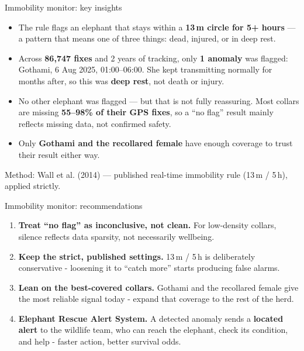\documentclass{beamer}
\newcommand{\hi}[1]{\textbf{\textcolor{hicolor}{#1}}}
\begin{document}
	\begin{frame}{Immobility monitor: key insights}
		\small
		\setlength{\itemsep}{6pt}
		\begin{itemize}
			\item The rule flags an elephant that stays within a \hi{13\,m circle for
				5+ hours} --- a pattern that means one of three things: dead, injured, or
			in deep rest.
			\item Across \hi{86,747 fixes} and 2 years of tracking, only \hi{1 anomaly}
			was flagged: Gothami, 6 Aug 2025, 01:00--06:00. She kept transmitting
			normally for months after, so this was \hi{deep rest}, not death or injury.
			\item No other elephant was flagged --- but that is not fully reassuring. Most
			collars are missing \hi{55--98\% of their GPS fixes}, so a ``no flag'' result
			mainly reflects missing data, not confirmed safety.
			\item Only \hi{Gothami and the recollared female} have enough coverage to
			trust their result either way.
		\end{itemize}
		\vfill
		{\footnotesize Method: Wall et al. (2014) --- published real-time immobility
			rule (13\,m / 5\,h), applied strictly.}
	\end{frame}
	
	
	
	\begin{frame}{Immobility monitor: recommendations}
		\small
		\setlength{\itemsep}{8pt}
		\begin{enumerate}
			\item \textbf{Treat ``no flag'' as inconclusive, not clean.} For low-density
			collars, silence reflects data sparsity, not necessarily wellbeing.
			\item \textbf{Keep the strict, published settings.} 13\,m / 5\,h is
			deliberately conservative - loosening it to ``catch more'' starts
			producing false alarms.
			\item \textbf{Lean on the best-covered collars.} Gothami and the recollared
			female give the most reliable signal today - expand that coverage to the
			rest of the herd.
			\item \textbf{Elephant Rescue Alert System.} A detected anomaly sends a
			\hi{located alert} to the wildlife team, who can reach the elephant, check
			its condition, and help - faster action, better survival odds. 
		\end{enumerate}
	\end{frame}
	
\end{document}
